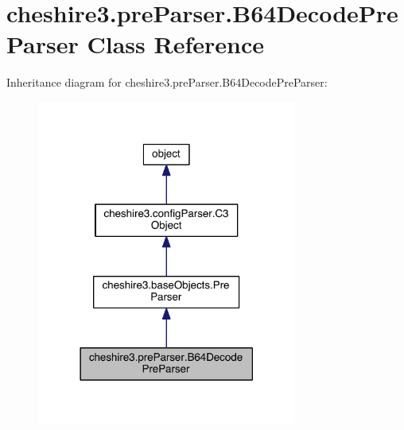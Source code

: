 \hypertarget{classcheshire3_1_1pre_parser_1_1_b64_decode_pre_parser}{\section{cheshire3.\-pre\-Parser.\-B64\-Decode\-Pre\-Parser Class Reference}
\label{classcheshire3_1_1pre_parser_1_1_b64_decode_pre_parser}
}


Inheritance diagram for cheshire3.\-pre\-Parser.\-B64\-Decode\-Pre\-Parser\-:
\nopagebreak
\begin{figure}[H]
\begin{center}
\leavevmode
\includegraphics[width=242pt]{classcheshire3_1_1pre_parser_1_1_b64_decode_pre_parser__inherit__graph}
\end{center}
\end{figure}


